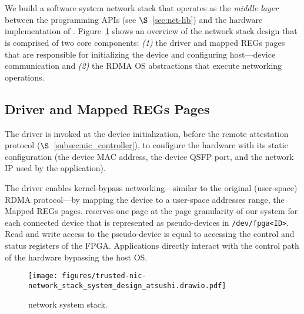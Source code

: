 \section{}
\label{sec:t-nic-network}




 
We build a software \projecttitle{} system network stack that operates as the {\em middle layer} between the \projecttitle{} programming APIs (see $\S$~\ref{sec:net-lib}) and the hardware implementation of \projecttitle{}. 
Figure~\ref{fig:network_stack_design} shows an overview of the network stack design that is comprised of two core components: {\em (1)} the \projecttitle{} driver and mapped REGs pages that are responsible for initializing the device and configuring host---device communication and {\em (2)} the RDMA OS abstractions that execute networking operations. 


\subsection{\projecttitle{} Driver and Mapped REGs Pages} 
The \projecttitle{} driver is invoked at the device initialization, before the remote attestation protocol ($\S$~\ref{subsec:nic_controller}), to configure the hardware with its static configuration (the device MAC address, the device QSFP port, and the network IP used by the application). 

The driver enables kernel-bypass networking---similar to the original (user-space) RDMA protocol---by mapping the \projecttitle{} device to a user-space addresses range, the Mapped REGs pages. \projecttitle{} reserves one page at the page granularity of our system for each connected device that is represented as pseudo-devices in {\tt /dev/fpga<ID>}. Read and write access to the pseudo-device is equal to accessing the control and status registers of the FPGA. Applications directly interact with the control path of the \projecttitle{} hardware bypassing the host OS.

\begin{figure}[t]
    \centering
    \texttt{[image: figures/trusted-nic-network\_stack\_system\_design\_atsushi.drawio.pdf]}
    \caption{\projecttitle{} network system stack.}
    \label{fig:network_stack_design}
\end{figure}


